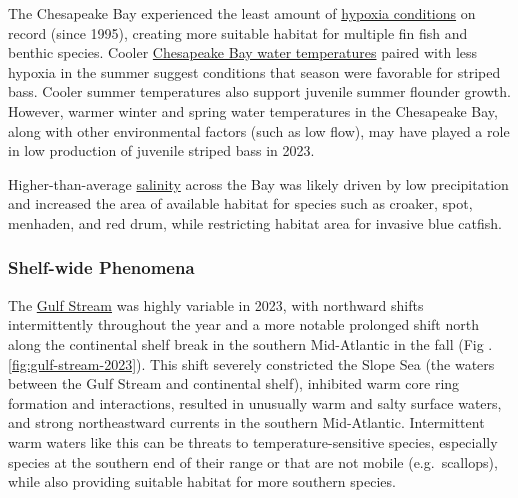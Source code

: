 \documentclass[
  10pt,
]{article}
\begin{document}
The Chesapeake Bay experienced the least amount of \href{https://noaa-edab.github.io/catalog/chesapeake-bay-2023-synthesis.html}{hypoxia conditions} on record (since 1995), creating more suitable habitat for multiple fin fish and benthic species. Cooler \href{https://noaa-edab.github.io/catalog/chesapeake-bay-seasonal-sea-surface-temperature-anomaly.html}{Chesapeake Bay water temperatures} paired with less hypoxia in the summer suggest conditions that season were favorable for striped bass. Cooler summer temperatures also support juvenile summer flounder growth. However, warmer winter and spring water temperatures in the Chesapeake Bay, along with other environmental factors (such as low flow), may have played a role in low production of juvenile striped bass in 2023.

Higher-than-average \href{https://noaa-edab.github.io/catalog/chesapeake-bay-salinity.html}{salinity} across the Bay was likely driven by low precipitation and increased the area of available habitat for species such as croaker, spot, menhaden, and red drum, while restricting habitat area for invasive blue catfish.

\hypertarget{shelf-wide-phenomena}{%
\subsubsection{Shelf-wide Phenomena}\label{shelf-wide-phenomena}}

The \href{https://noaa-edab.github.io/catalog/gulf-stream-index.html}{Gulf Stream} was highly variable in 2023, with northward shifts intermittently throughout the year and a more notable prolonged shift north along the continental shelf break in the southern Mid-Atlantic in the fall (Fig .\ref{fig:gulf-stream-2023}). This shift severely constricted the Slope Sea (the waters between the Gulf Stream and continental shelf), inhibited warm core ring formation and interactions, resulted in unusually warm and salty surface waters, and strong northeastward currents in the southern Mid-Atlantic. Intermittent warm waters like this can be threats to temperature-sensitive species, especially species at the southern end of their range or that are not mobile (e.g.~scallops), while also providing suitable habitat for more southern species.
\end{document}
